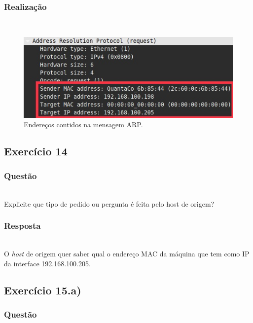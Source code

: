 \documentclass{llncs}
\begin{document}
\subsubsection{Realização}\rule[-10pt]{0pt}{10pt}\\

\begin{figure}
  \begin{center}
	  \includegraphics[scale=0.6]{./imagens/arp_request_addr.png} 
  \end{center}
	\caption{Endereços contidos na mensagem ARP.}
  \label{fig:arp_request_addr}
\end{figure} 


\clearpage
\subsection{Exercício 14}
\subsubsection{Questão}\rule[-10pt]{0pt}{10pt}\\

Explicite que tipo de pedido ou pergunta é feita pelo host de origem?

\subsubsection{Resposta}\rule[-10pt]{0pt}{10pt}\\

O \textit{host} de origem quer saber qual o endereço MAC da máquina que tem como IP da interface 192.168.100.205.


\clearpage
\subsection{Exercício 15.a)}
\subsubsection{Questão}\rule[-10pt]{0pt}{10pt}\\
\end{document}
